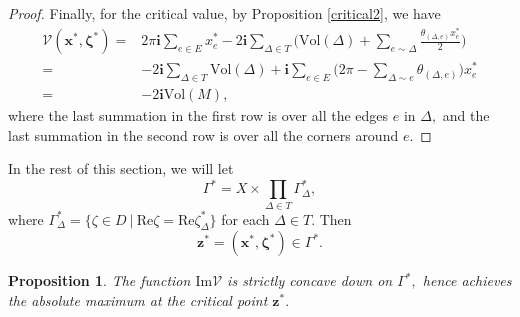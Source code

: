 \documentclass[11pt]{article}
\newtheorem{proposition}[theorem]{Proposition}
\theoremstyle{remark}
\theoremstyle{remark}
\numberwithin{equation}{section}
\begin{document}
\begin{proof}
 Finally, for the critical value, by Proposition \ref{critical2}, we have
\begin{equation*}
\begin{split}
\mathcal V(\boldsymbol x^*,\boldsymbol \zeta^*)=&2\pi \mathbf i \sum_{e\in E} x^*_e-2\mathbf i\sum_{\Delta\in T}\Big(\mathrm{Vol}(\Delta)+\sum_{e\sim \Delta}\frac{\theta_{(\Delta, e)}x^*_e}{2}\Big)\\
=& -2\mathbf i\sum_{\Delta\in T}\mathrm{Vol}(\Delta)+\mathbf i\sum_{e\in E} \Big(2\pi -\sum_{\Delta\sim e} \theta_{(\Delta,e)}\Big)x^*_e\\
=& -2\mathbf i\mathrm{Vol}(M),
\end{split}
\end{equation*}
where the last summation in the first row is over all the edges $e$ in $\Delta,$ and the last summation in the second row is over all the corners around $e.$ 
\end{proof}

In the rest of this section, we will let 
$$\Gamma^* = X\times \prod_{\Delta\in T} \Gamma^*_\Delta,$$ where
$\Gamma^*_\Delta = \Big\{ \zeta\in D \ \Big|\ \mathrm{Re}\zeta=\mathrm{Re}\zeta^*_\Delta \Big\}$
 for each $\Delta\in T.$ Then 
  $$\boldsymbol z^*=(\boldsymbol x^*,\boldsymbol \zeta^*)\in \Gamma^*.$$


\begin{proposition}\label{cd}
The function $\mathrm{Im}\mathcal V$ is strictly concave down on $\Gamma^*,$ hence achieves the absolute maximum at the critical point $\boldsymbol z^*.$
  \end{proposition}
\end{document}
